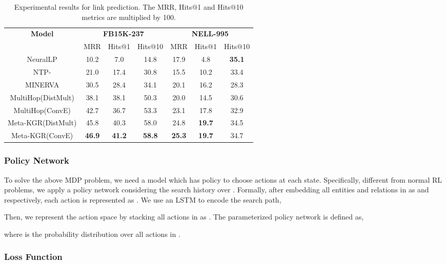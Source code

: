 \documentclass[11pt,a4paper]{article}
\begin{document}
\begin{table*}[t]
\small
\centering
\setlength{\belowcaptionskip}{-1pt}
    \begin{tabular}{c|ccc|ccc}
    \toprule
    \multirow{2}{*}{\textbf{Model}} & \multicolumn{3}{c|}{\textbf{FB15K-237}} & \multicolumn{3}{c}{\textbf{NELL-995}} \\
    & MRR & Hits@1 & Hits@10 & MRR & Hits@1 & Hits@10  \\
    \midrule
    NeuralLP  & 10.2  & 7.0  & 14.8   & 17.9  & 4.8 & \textbf{35.1}  \\
    NTP-  & 21.0  & 17.4 & 30.8   & 15.5  & 10.2 & 33.4  \\
    MINERVA  & 30.5  & 28.4  & 34.1   & 20.1  & 16.2 & 28.3  \\
    MultiHop(DistMult)  & 38.1  & 38.1  & 50.3   & 20.0  & 14.5 & 30.6  \\
    MultiHop(ConvE)  & 42.7  & 36.7  & 53.3   & 23.1  & 17.8 & 32.9  \\
    Meta-KGR(DistMult)  & 45.8  & 40.3  & 58.0   & 24.8  & \textbf{19.7} & 34.5  \\
    Meta-KGR(ConvE)  & \textbf{46.9}  & \textbf{41.2} & \textbf{58.8}   & \textbf{25.3}  & \textbf{19.7} & 34.7  \\
    \bottomrule
    \end{tabular}
    \caption{\label{table} Experimental results for link prediction. The MRR, Hits@1 and Hits@10 metrics are multiplied by 100.}
\end{table*}


\subsubsection{Policy Network}

To solve the above MDP problem, we need a model which has policy to choose actions at each state. Specifically, different from normal RL problems, we apply a policy network considering the search history over . Formally, after embedding all entities and relations in  as  and  respectively, each action  is represented as . We use an LSTM to encode the search path,


Then, we represent the action space by stacking all actions in  as . The parameterized policy network is defined as,

where  is the probability distribution over all actions in .

\subsubsection{Loss Function}
\end{document}
